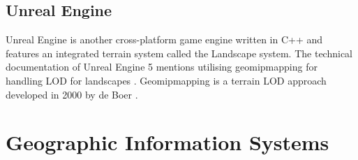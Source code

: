 \subsection{Unreal Engine}
Unreal Engine is another cross-platform game engine written in C++ and features
an integrated terrain system called the Landscape system.
The technical documentation of Unreal Engine 5 mentions utilising geomipmapping for 
handling LOD for landscapes \cite{unrealengine5doc}. Geomipmapping is a terrain LOD approach developed 
in 2000 by de Boer \cite{geomipmapping}. %

\section{Geographic Information Systems}
